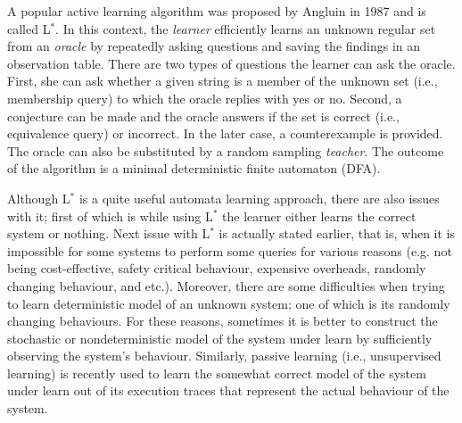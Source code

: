 \documentclass[
a4paper,
12pt
]{scrartcl}
\begin{document}

\par A popular active learning algorithm was proposed by Angluin \cite{Angluin.1987} in 1987 and is called L$^*$. In this context, the \textit{learner} efficiently learns an unknown regular set from an \textit{oracle} by repeatedly asking questions and saving the findings in an observation table. There are two types of questions the learner can ask the oracle. First, she can ask whether a given string is a member of the unknown set (i.e., membership query) to which the oracle replies with yes or no. Second, a conjecture can be made and the oracle answers if the set is correct (i.e., equivalence query) or incorrect. In the later case, a counterexample is provided. The oracle can also be substituted by a random sampling \textit{teacher}. The outcome of the algorithm is a minimal deterministic finite automaton (DFA).

\par Although L$^*$ is a quite useful automata learning approach, there are also issues with it; first of which is while using L$^*$ the learner either learns the correct system or nothing. Next issue with L$^*$ is actually stated earlier, that is, when it is impossible for some systems to perform some queries for various reasons (e.g. not being cost-effective, safety critical behaviour, expensive overheads, randomly changing behaviour, and etc.). Moreover, there are some difficulties when trying to learn deterministic model of an unknown system; one of which is its randomly changing behaviours. For these reasons, sometimes it is better to construct the stochastic or nondeterministic model of the system under learn by sufficiently observing the system's behaviour. Similarly, passive learning (i.e., unsupervised learning) is recently used to learn the somewhat correct model of the system under learn out of its execution traces that represent the actual behaviour of the system.
\end{document}
